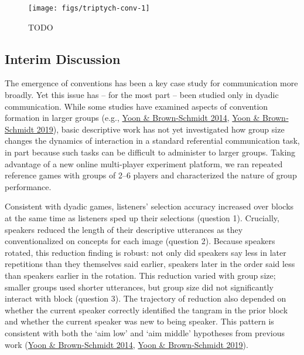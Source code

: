 \documentclass[
  english,
  a4paper,
]{article}
\begin{document}
\begin{figure*}[t!]

{\centering \texttt{[image: figs/triptych-conv-1]} 

}

\caption{TODO}\label{fig:triptych-conv}
\end{figure*}

\hypertarget{interim-discussion}{%
\subsection{Interim Discussion}\label{interim-discussion}}

The emergence of conventions has been a key case study for communication more broadly. Yet this issue has -- for the most part -- been studied only in dyadic communication. While some studies have examined aspects of convention formation in larger groups (e.g., \protect\hyperlink{ref-yoonAdjustingConceptualPacts2014}{Yoon \& Brown-Schmidt 2014}, \protect\hyperlink{ref-yoonAudienceDesignMultiparty2019}{Yoon \& Brown‐Schmidt 2019}), basic descriptive work has not yet investigated how group size changes the dynamics of interaction in a standard referential communication task, in part because such tasks can be difficult to administer to larger groups. Taking advantage of a new online multi-player experiment platform, we ran repeated reference games with groups of 2--6 players and characterized the nature of group performance.

Consistent with dyadic games, listeners' selection accuracy increased over blocks at the same time as listeners sped up their selections (question 1).
Crucially, speakers reduced the length of their descriptive utterances as they conventionalized on concepts for each image (question 2). Because speakers rotated, this reduction finding is robust: not only did speakers say less in later repetitions than they themselves said earlier, speakers later in the order said less than speakers earlier in the rotation. This reduction varied with group size; smaller groups used shorter utterances, but group size did not significantly interact with block (question 3). The trajectory of reduction also depended on whether the current speaker correctly identified the tangram in the prior block and whether the current speaker was new to being speaker. This pattern is consistent with both the `aim low' and `aim middle' hypotheses from previous work (\protect\hyperlink{ref-yoonAdjustingConceptualPacts2014}{Yoon \& Brown-Schmidt 2014}, \protect\hyperlink{ref-yoonAudienceDesignMultiparty2019}{Yoon \& Brown‐Schmidt 2019}).
\end{document}
